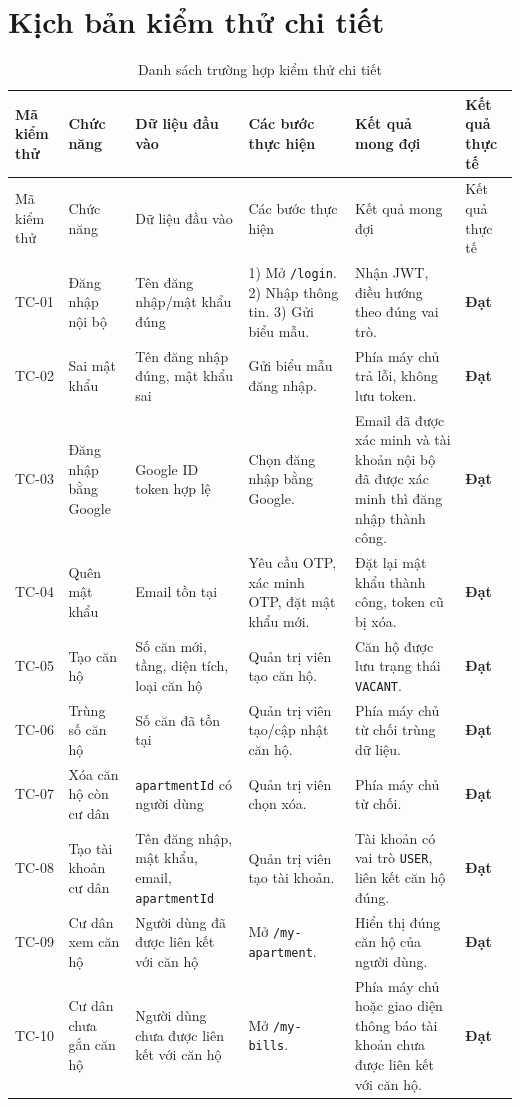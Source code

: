 ﻿\documentclass[12pt,a4paper]{report}
\begin{document}
\section{Kịch bản kiểm thử chi tiết}
\begingroup\scriptsize
\begin{longtable}{L{1.15cm} L{2.2cm} L{2.8cm} L{3.4cm} L{3.4cm} L{1.45cm}}
\caption{Danh sách trường hợp kiểm thử chi tiết}\label{tab:test-cases}\\
\toprule
Mã kiểm thử & Chức năng & Dữ liệu đầu vào & Các bước thực hiện & Kết quả mong đợi & Kết quả thực tế \\
\midrule
\endfirsthead
\toprule
Mã kiểm thử & Chức năng & Dữ liệu đầu vào & Các bước thực hiện & Kết quả mong đợi & Kết quả thực tế \\
\midrule
\endhead
TC-01 & Đăng nhập nội bộ & Tên đăng nhập/mật khẩu đúng & 1) Mở \texttt{/login}. 2) Nhập thông tin. 3) Gửi biểu mẫu. & Nhận JWT, điều hướng theo đúng vai trò. & \textbf{Đạt} \\
TC-02 & Sai mật khẩu & Tên đăng nhập đúng, mật khẩu sai & Gửi biểu mẫu đăng nhập. & Phía máy chủ trả lỗi, không lưu token. & \textbf{Đạt} \\
TC-03 & Đăng nhập bằng Google & Google ID token hợp lệ & Chọn đăng nhập bằng Google. & Email đã được xác minh và tài khoản nội bộ đã được xác minh thì đăng nhập thành công. & \textbf{Đạt} \\
TC-04 & Quên mật khẩu & Email tồn tại & Yêu cầu OTP, xác minh OTP, đặt mật khẩu mới. & Đặt lại mật khẩu thành công, token cũ bị xóa. & \textbf{Đạt} \\
TC-05 & Tạo căn hộ & Số căn mới, tầng, diện tích, loại căn hộ & Quản trị viên tạo căn hộ. & Căn hộ được lưu trạng thái \texttt{VACANT}. & \textbf{Đạt} \\
TC-06 & Trùng số căn hộ & Số căn đã tồn tại & Quản trị viên tạo/cập nhật căn hộ. & Phía máy chủ từ chối trùng dữ liệu. & \textbf{Đạt} \\
TC-07 & Xóa căn hộ còn cư dân & \texttt{apartmentId} có người dùng & Quản trị viên chọn xóa. & Phía máy chủ từ chối. & \textbf{Đạt} \\
TC-08 & Tạo tài khoản cư dân & Tên đăng nhập, mật khẩu, email, \texttt{apartmentId} & Quản trị viên tạo tài khoản. & Tài khoản có vai trò \texttt{USER}, liên kết căn hộ đúng. & \textbf{Đạt} \\
TC-09 & Cư dân xem căn hộ & Người dùng đã được liên kết với căn hộ & Mở \texttt{/my-apartment}. & Hiển thị đúng căn hộ của người dùng. & \textbf{Đạt} \\
TC-10 & Cư dân chưa gắn căn hộ & Người dùng chưa được liên kết với căn hộ & Mở \texttt{/my-bills}. & Phía máy chủ hoặc giao diện thông báo tài khoản chưa được liên kết với căn hộ. & \textbf{Đạt} \\

\end{longtable}
\end{document}
